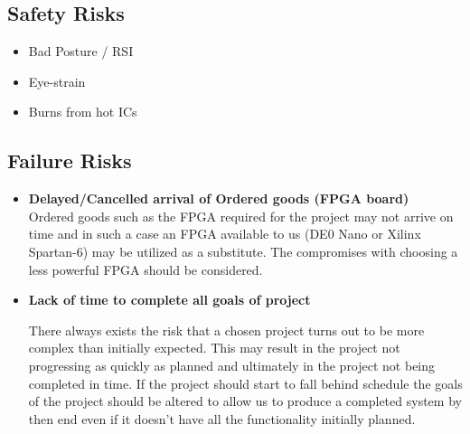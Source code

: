 
\iffalse

Safety Risks: Please identify the Laboratories in which you will work. 

The Managers of these labs MUST approve the assessment forms you have filled in. 

If you can, try to meet with them and show them the assessments you are planning to post.
The forms are available on Moodle.

Failure Risks: These are your estimates of the risks you face with your current plan. 
If you indicate a high risk of failure, that is, something with which you are uncomfortable, you should outline a new plan to use as backup in case the current plan does not work out for you. 
You can record the details of any alternative plan in your December Interim Report.

\fi

\subsection{Safety Risks}

\begin{itemize}
	\item Bad Posture / RSI
	\item Eye-strain
	\item Burns from hot ICs
\end{itemize}

\subsection{Failure Risks}

\begin{itemize}
	\item \textbf{Delayed/Cancelled arrival of Ordered goods (FPGA board)}\\
	
	Ordered goods such as the FPGA required for the project may not arrive on time and in such a case an FPGA available to us (DE0 Nano or Xilinx Spartan-6) may be utilized as a substitute. The compromises with choosing a less powerful FPGA should be considered.
	
	\item \textbf{Lack of time to complete all goals of project}
	
	There always exists the risk that a chosen project turns out to be more complex than initially expected. This may result in the project not progressing as quickly as planned and ultimately in the project not being completed in time. If the project should start to fall behind schedule the goals of the project should be altered to allow us to produce a completed system by then end even if it doesn't have all the functionality initially planned.
\end{itemize}